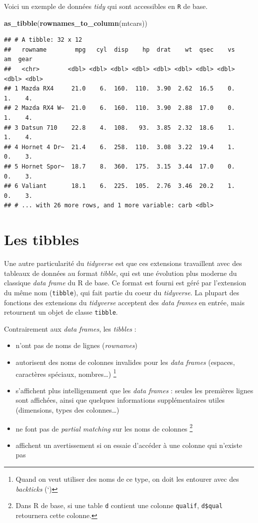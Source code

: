 \documentclass[]{book}
\newenvironment{Shaded}{\begin{snugshade}}{\end{snugshade}}
\newcommand{\KeywordTok}[1]{\textcolor[rgb]{0.13,0.29,0.53}{\textbf{#1}}}
\newcommand{\NormalTok}[1]{#1}
\providecommand{\tightlist}{%
  \setlength{\itemsep}{0pt}\setlength{\parskip}{0pt}}
\let\rmarkdownfootnote\footnote%
\def\footnote{\protect\rmarkdownfootnote}
\begin{document}
Voici un exemple de données \emph{tidy} qui sont accessibles en
\texttt{R} de base.

\begin{Shaded}
\begin{Highlighting}[]
\KeywordTok{as_tibble}\NormalTok{(}\KeywordTok{rownames_to_column}\NormalTok{(mtcars))}
\end{Highlighting}
\end{Shaded}

\begin{verbatim}
## # A tibble: 32 x 12
##   rowname        mpg   cyl  disp    hp  drat    wt  qsec    vs    am  gear
##   <chr>        <dbl> <dbl> <dbl> <dbl> <dbl> <dbl> <dbl> <dbl> <dbl> <dbl>
## 1 Mazda RX4     21.0    6.  160.  110.  3.90  2.62  16.5    0.    1.    4.
## 2 Mazda RX4 W~  21.0    6.  160.  110.  3.90  2.88  17.0    0.    1.    4.
## 3 Datsun 710    22.8    4.  108.   93.  3.85  2.32  18.6    1.    1.    4.
## 4 Hornet 4 Dr~  21.4    6.  258.  110.  3.08  3.22  19.4    1.    0.    3.
## 5 Hornet Spor~  18.7    8.  360.  175.  3.15  3.44  17.0    0.    0.    3.
## 6 Valiant       18.1    6.  225.  105.  2.76  3.46  20.2    1.    0.    3.
## # ... with 26 more rows, and 1 more variable: carb <dbl>
\end{verbatim}

\section{Les tibbles}\label{tibbles}

Une autre particularité du \emph{tidyverse} est que ces extensions
travaillent avec des tableaux de données au format \emph{tibble}, qui
est une évolution plus moderne du classique \emph{data frame} du R de
base. Ce format est fourni est géré par l'extension du même nom
(\texttt{tibble}), qui fait partie du coeur du \emph{tidyverse}. La
plupart des fonctions des extensions du \emph{tidyverse} acceptent des
\emph{data frames} en entrée, mais retournent un objet de classe
\texttt{tibble}.

Contrairement aux \emph{data frames}, les \emph{tibbles} :

\begin{itemize}
\tightlist
\item
  n'ont pas de noms de lignes (\emph{rownames})
\item
  autorisent des noms de colonnes invalides pour les \emph{data frames}
  (espaces, caractères spéciaux, nombres\ldots{}) \footnote{Quand on
    veut utiliser des noms de ce type, on doit les entourer avec des
    \emph{backticks} (`)}
\item
  s'affichent plus intelligemment que les \emph{data frames} : seules
  les premières lignes sont affichées, ainsi que quelques informations
  supplémentaires utiles (dimensions, types des colonnes\ldots{})
\item
  ne font pas de \emph{partial matching} sur les noms de colonnes
  \footnote{Dans R de base, si une table \texttt{d} contient une colonne
    \texttt{qualif}, \texttt{d\$qual} retournera cette colonne.}
\item
  affichent un avertissement si on essaie d'accéder à une colonne qui
  n'existe pas
\end{itemize}
\end{document}
